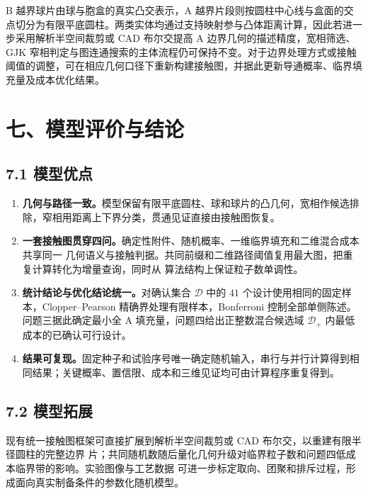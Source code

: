 B 越界球片由球与胞盒的真实凸交表示，A 越界片段则按圆柱中心线与盒面的交点切分为有限平底圆柱。两类实体均通过支持映射参与凸体距离计算，因此若进一步采用解析半空间裁剪或 CAD 布尔交提高 A 边界几何的描述精度，宽相筛选、GJK 窄相判定与图连通搜索的主体流程仍可保持不变。对于边界处理方式或接触阈值的调整，可在相应几何口径下重新构建接触图，并据此更新导通概率、临界填充量及成本优化结果。

\section{七、模型评价与结论}\label{ux4e03ux6a21ux578bux8bc4ux4ef7ux4e0eux7ed3ux8bba}

\begingroup
\small
\subsection{7.1 模型优点}\label{ux6a21ux578bux4f18ux70b9}

\begin{enumerate}
\def\labelenumi{\arabic{enumi}.}
\tightlist
\item
  \textbf{几何与路径一致。}模型保留有限平底圆柱、球和球片的凸几何，宽相作候选排除，窄相用距离上下界分类，贯通见证直接由接触图恢复。
\item
  \textbf{一套接触图贯穿四问。}确定性附件、随机概率、一维临界填充和二维混合成本共享同一 几何语义与接触判据。共同前缀和二维路径阈值复用最大图，把重复计算转化为增量查询，同时从 算法结构上保证粒子数单调性。
\item
  \textbf{统计结论与优化结论统一。}对确认集合 \(\mathcal D\) 中的 \(41\) 个设计使用相同的固定样本，Clopper--Pearson 精确界处理有限样本，Bonferroni 控制全部单侧陈述。问题三据此确定最小全 A 填充量，问题四给出正整数混合候选域 \(\mathcal D_+\) 内最低成本的已确认可行设计。
\item
  \textbf{结果可复现。}固定种子和试验序号唯一确定随机输入，串行与并行计算得到相同结果；关键概率、置信限、成本和三维见证均可由计算程序重复得到。
\end{enumerate}

\subsection{7.2 模型拓展}\label{ux5c40ux9650ux4e0eux6539ux8fdbux65b9ux5411}

现有统一接触图框架可直接扩展到解析半空间裁剪或 CAD 布尔交，以重建有限半径圆柱的完整边界 片；共同随机数随后量化几何升级对临界粒子数和问题四低成本临界带的影响。实验图像与工艺数据 可进一步标定取向、团聚和排斥过程，形成面向真实制备条件的参数化随机模型。

